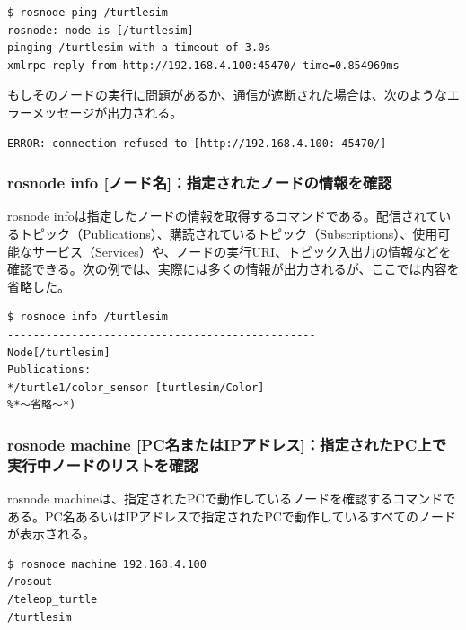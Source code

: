 \begin{lstlisting}[language=ROS]
$ rosnode ping /turtlesim
rosnode: node is [/turtlesim]
pinging /turtlesim with a timeout of 3.0s
xmlrpc reply from http://192.168.4.100:45470/ time=0.854969ms
\end{lstlisting}

もしそのノードの実行に問題があるか、通信が遮断された場合は、次のようなエラーメッセージが出力される。

\begin{lstlisting}[language=ROS]
ERROR: connection refused to [http://192.168.4.100: 45470/]
\end{lstlisting}

\subsubsection{rosnode info [ノード名]：指定されたノードの情報を確認}

rosnode infoは指定したノードの情報を取得するコマンドである。配信されているトピック（Publications）、購読されているトピック（Subscriptions）、使用可能なサービス（Services）や、ノードの実行URI、トピック入出力の情報などを確認できる。次の例では、実際には多くの情報が出力されるが、ここでは内容を省略した。

\begin{lstlisting}[language=ROS]
$ rosnode info /turtlesim
------------------------------------------------
Node[/turtlesim]
Publications:
*/turtle1/color_sensor [turtlesim/Color]
%*〜省略〜*)
\end{lstlisting}

\subsubsection{rosnode machine [PC名またはIPアドレス]：指定されたPC上で実行中ノードのリストを確認}

rosnode machineは、指定されたPCで動作しているノードを確認するコマンドである。PC名あるいはIPアドレスで指定されたPCで動作しているすべてのノードが表示される。

\begin{lstlisting}[language=ROS]
$ rosnode machine 192.168.4.100
/rosout
/teleop_turtle
/turtlesim
\end{lstlisting}

